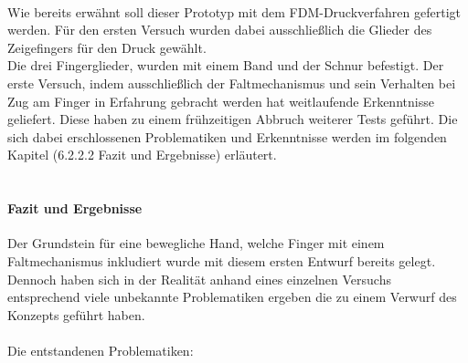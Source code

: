 \documentclass[titlepage,12pt,twoside]{article}
\begin{document}
\\
Wie bereits erwähnt soll dieser Prototyp mit dem FDM-Druckverfahren gefertigt 
werden. Für den ersten Versuch wurden dabei ausschließlich die Glieder des 
Zeigefingers für den Druck gewählt. \\
Die drei Fingerglieder, wurden mit einem Band und der Schnur befestigt. 
Der erste Versuch, indem ausschließlich der Faltmechanismus und sein 
Verhalten bei Zug am Finger in Erfahrung gebracht werden hat weitlaufende 
Erkenntnisse geliefert. Diese haben zu einem frühzeitigen Abbruch weiterer 
Tests geführt. Die sich dabei erschlossenen Problematiken und Erkenntnisse 
werden im folgenden Kapitel (6.2.2.2 Fazit und Ergebnisse) erläutert. \\
\\

\paragraph{Fazit und Ergebnisse}
\hfill \break
\hfill \break
Der Grundstein für eine bewegliche Hand, welche Finger mit einem 
Faltmechanismus inkludiert wurde mit diesem ersten Entwurf bereits gelegt. 
Dennoch haben sich in der Realität anhand eines einzelnen Versuchs 
entsprechend viele unbekannte Problematiken ergeben die zu einem Verwurf des 
Konzepts geführt haben. \\
\\
Die entstandenen Problematiken:
\end{document}

